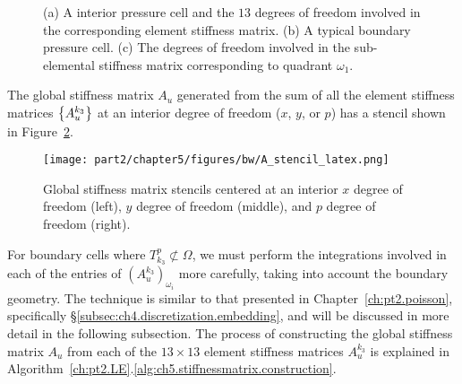\setlength{\figurewidth}{0.30\columnwidth}
\begin{figure}[htbp]
\begin{center}
\caption{(a) A interior pressure cell and the $13$ degrees of freedom involved in the corresponding element stiffness matrix. (b) A typical boundary pressure cell. (c) The degrees of freedom involved in the sub-elemental stiffness matrix corresponding to quadrant $\omega_1$. }
\label{fig:ch5:stiffnessmatrix.element}
\end{center}
\end{figure}

The global stiffness matrix $A_u$ generated from the sum of all the element stiffness matrices $\left\lbrace A_u^{k_3} \right\rbrace$ at an interior degree of freedom ($x$, $y$, or $p$) has a stencil shown in Figure~\ref{fig:ch5.stiffnessmatrix.global}.

\setlength{\figurewidth}{0.80\columnwidth}
\begin{figure}[htbp]
\begin{center}
\texttt{[image: part2/chapter5/figures/bw/A\_stencil\_latex.png]}
\caption{Global stiffness matrix stencils centered at an interior $x$ degree of freedom (left), $y$ degree of freedom (middle), and $p$ degree of freedom (right).}
\label{fig:ch5.stiffnessmatrix.global}
\end{center}
\end{figure}

For boundary cells where $T^p_{k_3} \not\subset \Omega$, we must perform the integrations involved in each of the entries of $(A_u^{k_3})_{\omega_i}$ more carefully, taking into account the boundary geometry. The technique is similar to that presented in Chapter~\ref{ch:pt2.poisson}, specifically \S\ref{subsec:ch4.discretization.embedding}, and will be discussed in more detail in the following subsection. The process of constructing the global stiffness matrix $A_u$ from each of the $13 \times 13$ element stiffness matrices $A_u^{k_3}$ is explained in Algorithm~\ref{ch:pt2.LE}.\ref{alg:ch5.stiffnessmatrix.construction}.

